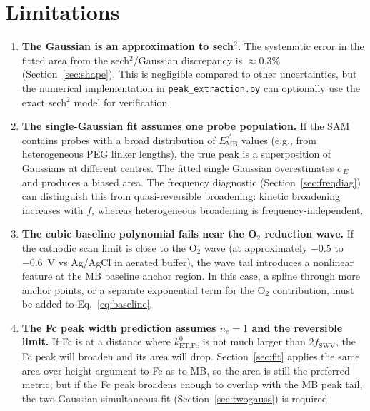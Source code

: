\documentclass[10pt,a4paper]{article}
\numberwithin{equation}{section}
\newcommand{\Eo}{E^{\circ\prime}}
\begin{document}
\section{Limitations}
\label{sec:limits}

\begin{enumerate}[leftmargin=*]

\item \textbf{The Gaussian is an approximation to sech$^2$.} The systematic
  error in the fitted area from the sech$^2$/Gaussian discrepancy is
  $\approx 0.3\%$ (Section~\ref{sec:shape}). This is negligible compared
  to other uncertainties, but the numerical implementation in
  \texttt{peak\_extraction.py} can optionally use the exact sech$^2$ model
  for verification.

\item \textbf{The single-Gaussian fit assumes one probe population.} If the
  SAM contains probes with a broad distribution of $\Eo_\text{MB}$ values
  (e.g., from heterogeneous PEG linker lengths), the true peak is a
  superposition of Gaussians at different centres. The fitted single Gaussian
  overestimates $\sigma_E$ and produces a biased area. The frequency
  diagnostic (Section~\ref{sec:freqdiag}) can distinguish this from
  quasi-reversible broadening: kinetic broadening increases with $f$,
  whereas heterogeneous broadening is frequency-independent.

\item \textbf{The cubic baseline polynomial fails near the O$_2$ reduction
  wave.} If the cathodic scan limit is close to the O$_2$ wave (at
  approximately $-0.5$ to $-0.6$~V vs Ag/AgCl in aerated buffer), the wave
  tail introduces a nonlinear feature at the MB baseline anchor region. In
  this case, a spline through more anchor points, or a separate exponential
  term for the O$_2$ contribution, must be added to Eq.~\eqref{eq:baseline}.

\item \textbf{The Fc peak width prediction assumes $n_e = 1$ and the
  reversible limit.} If Fc is at a distance where $k^{0}_{\text{ET,Fc}}$ is not
  much larger than $2f_\text{SWV}$, the Fc peak will broaden and its area
  will drop. Section~\ref{sec:fit} applies the same area-over-height
  argument to Fc as to MB, so the area is still the preferred metric; but
  if the Fc peak broadens enough to overlap with the MB peak tail, the
  two-Gaussian simultaneous fit (Section~\ref{sec:twogauss}) is required.

\end{enumerate}
\end{document}
